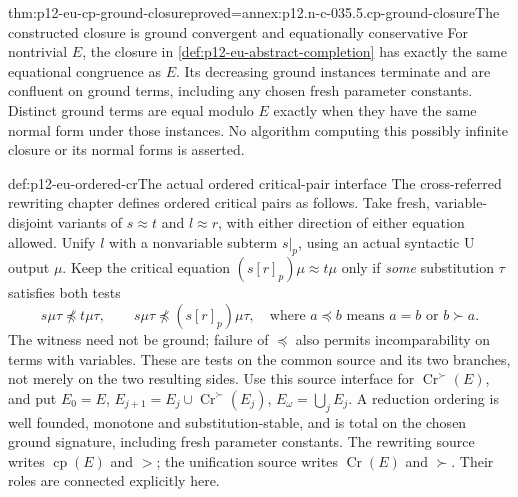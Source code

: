\begin{hbtheorem}{thm:p12-eu-cp-ground-closure}{proved=annex:p12.n-c-035.5.cp-ground-closure}{The constructed closure is ground convergent and equationally conservative}
For nontrivial \(E\), the closure in
\cref{def:p12-eu-abstract-completion} has exactly the same equational
congruence as \(E\). Its decreasing ground instances terminate and
are confluent on ground terms, including any chosen fresh parameter
constants. Distinct ground terms are equal modulo \(E\) exactly
when they have the same normal form under those instances.
No algorithm computing this possibly infinite closure or its normal
forms is asserted.
\end{hbtheorem}

\begin{hbdefinition}{def:p12-eu-ordered-cr}{The actual ordered critical-pair interface}
The cross-referred rewriting chapter defines ordered critical pairs as
follows. Take fresh, variable-disjoint variants of \(s\approx t\)
and \(l\approx r\), with either direction of either equation allowed.
Unify \(l\) with a nonvariable subterm \(s|_p\), using an actual
syntactic U output \(\mu\). Keep the critical equation
\((s[r]_p)\mu\approx t\mu\) only if \emph{some} substitution
\(\tau\) satisfies both tests
\[
 s\mu\tau\not\preceq t\mu\tau,
 \qquad s\mu\tau\not\preceq(s[r]_p)\mu\tau,
 \quad\text{where }a\preceq b\text{ means }a=b\text{ or }b\succ a.
\]
The witness need not be ground; failure of \(\preceq\) also permits
incomparability on terms with variables. These are tests on the common
source and its two branches, not merely on the two resulting sides.
Use this source interface for \(\operatorname{Cr}^{\succ}(E)\),
and put \(E_0=E\), \(E_{j+1}=E_j\cup\operatorname{Cr}^{\succ}(E_j)\),
\(E_\omega=\bigcup_jE_j\). A reduction ordering is well founded,
monotone and substitution-stable, and is total on the chosen ground
signature, including fresh parameter constants.
The rewriting source writes \(\operatorname{cp}(E)\) and \(>\);
the unification source writes \(\operatorname{Cr}(E)\) and
\(\succ\). Their roles are connected explicitly here.
\cite[Definition 4.10, p.~492]{BaaderSnyder2001}
\cite[Definitions 4.5 and 6.2, pp.~547,569]{DershowitzPlaisted2001Rewriting}
\end{hbdefinition}

